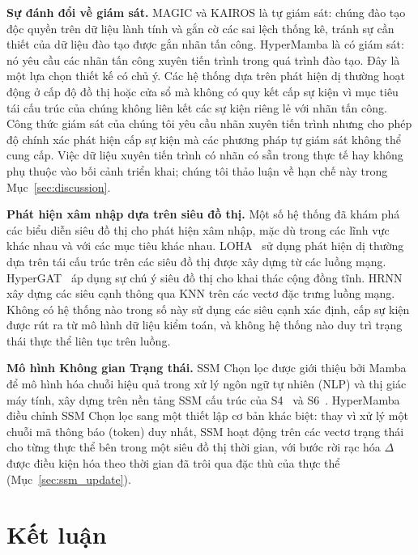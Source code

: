 \documentclass[letterpaper,twocolumn,10pt]{article}
\begin{document}
\textbf{Sự đánh đổi về giám sát.} MAGIC và KAIROS là tự giám sát: chúng đào tạo độc quyền trên dữ liệu lành tính và gắn cờ các sai lệch thống kê, tránh sự cần thiết của dữ liệu đào tạo được gắn nhãn tấn công. HyperMamba là có giám sát: nó yêu cầu các nhãn tấn công xuyên tiến trình trong quá trình đào tạo. Đây là một lựa chọn thiết kế có chủ ý. Các hệ thống dựa trên phát hiện dị thường hoạt động ở cấp độ đồ thị hoặc cửa sổ mà không có quy kết cấp sự kiện vì mục tiêu tái cấu trúc của chúng không liên kết các sự kiện riêng lẻ với nhãn tấn công. Công thức giám sát của chúng tôi yêu cầu nhãn xuyên tiến trình nhưng cho phép độ chính xác phát hiện cấp sự kiện mà các phương pháp tự giám sát không thể cung cấp. Việc dữ liệu xuyên tiến trình có nhãn có sẵn trong thực tế hay không phụ thuộc vào bối cảnh triển khai; chúng tôi thảo luận về hạn chế này trong Mục~\ref{sec:discussion}.

\textbf{Phát hiện xâm nhập dựa trên siêu đồ thị.} Một số hệ thống đã khám phá các biểu diễn siêu đồ thị cho phát hiện xâm nhập, mặc dù trong các lĩnh vực khác nhau và với các mục tiêu khác nhau. LOHA~\cite{chen2025loha} sử dụng phát hiện dị thường dựa trên tái cấu trúc trên các siêu đồ thị được xây dựng từ các luồng mạng. HyperGAT~\cite{ding-etal-2020-less} áp dụng sự chú ý siêu đồ thị cho khai thác cộng đồng tĩnh. HRNN~\cite{yang2024hrnn} xây dựng các siêu cạnh thông qua KNN trên các vectơ đặc trưng luồng mạng. Không có hệ thống nào trong số này sử dụng các siêu cạnh xác định, cấp sự kiện được rút ra từ mô hình dữ liệu kiểm toán, và không hệ thống nào duy trì trạng thái thực thể liên tục trên luồng.

\textbf{Mô hình Không gian Trạng thái.} SSM Chọn lọc được giới thiệu bởi Mamba~\cite{gu2024mamba} để mô hình hóa chuỗi hiệu quả trong xử lý ngôn ngữ tự nhiên (NLP) và thị giác máy tính, xây dựng trên nền tảng SSM cấu trúc của S4~\cite{gu2022efficiently} và S6~\cite{gu2024mamba}. HyperMamba điều chỉnh SSM Chọn lọc sang một thiết lập cơ bản khác biệt: thay vì xử lý một chuỗi mã thông báo (token) duy nhất, SSM hoạt động trên các vectơ trạng thái cho từng thực thể bên trong một siêu đồ thị thời gian, với bước rời rạc hóa $\Delta$ được điều kiện hóa theo thời gian đã trôi qua đặc thù của thực thể (Mục~\ref{sec:ssm_update}).

\section{Kết luận}
\label{sec:conclusion}
\end{document}
